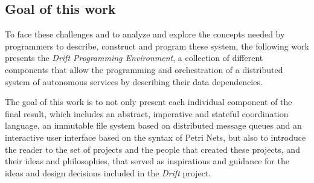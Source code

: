 \subsection{Goal of this work}
To face these challenges and to analyze and explore the
concepts needed by programmers to describe, construct and program
these system, the following work presents the
\textit{Drift Programming Environment}, a collection of different
components that allow the programming and orchestration of a
distributed system of autonomous services by describing
their data dependencies.

The goal of this work is to not only present each individual
component of the final result, which includes an abstract,
imperative and stateful coordination language, an immutable
file system based on distributed message queues and an interactive
user interface based on the syntax of Petri Nets,
but also to introduce the reader to the set of projects and the
people that created these projects, and their ideas and philosophies,
that served as inspirations and guidance for the ideas and design decisions
included in the \textit{Drift} project.




